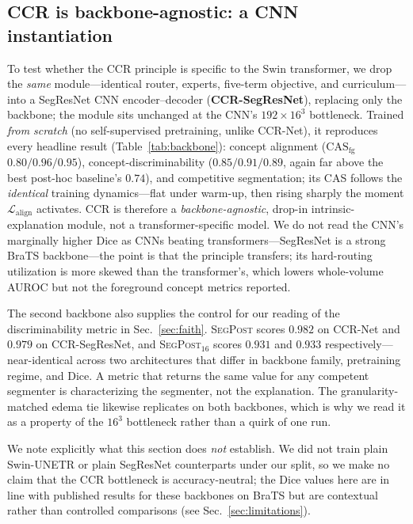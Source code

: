 \documentclass[runningheads]{llncs}
\newcommand{\casfg}{\mathrm{CAS}_{\mathrm{fg}}}
\begin{document}
\subsection{CCR is backbone-agnostic: a CNN instantiation}\label{sec:backbone}
To test whether the CCR principle is specific to the Swin transformer, we drop the \emph{same}
module---identical router, experts, five-term objective, and curriculum---into a SegResNet CNN
encoder--decoder (\textbf{CCR-SegResNet}), replacing only the backbone; the module sits unchanged
at the CNN's $192\times16^3$ bottleneck. Trained \emph{from scratch} (no self-supervised
pretraining, unlike CCR-Net), it reproduces every headline result (Table~\ref{tab:backbone}):
concept alignment ($\casfg$ $0.80/0.96/0.95$), concept-discriminability ($0.85/0.91/0.89$, again
far above the best post-hoc baseline's $0.74$), and competitive segmentation; its CAS follows the
\emph{identical} training dynamics---flat under warm-up, then rising sharply the moment
$\mathcal{L}_{\text{align}}$ activates. CCR is therefore a \emph{backbone-agnostic}, drop-in
intrinsic-explanation module, not a transformer-specific model. We do not read the CNN's
marginally higher Dice as CNNs beating transformers---SegResNet is a strong BraTS backbone---the
point is that the principle transfers; its hard-routing utilization is more skewed than the
transformer's, which lowers whole-volume AUROC but not the foreground concept metrics reported.

The second backbone also supplies the control for our reading of the discriminability metric in
Sec.~\ref{sec:faith}. \textsc{SegPost} scores $0.982$ on CCR-Net and $0.979$ on CCR-SegResNet, and
\textsc{SegPost}$_{16}$ scores $0.931$ and $0.933$ respectively---near-identical across two
architectures that differ in backbone family, pretraining regime, and Dice. A metric that returns
the same value for any competent segmenter is characterizing the segmenter, not the explanation.
The granularity-matched edema tie likewise replicates on both backbones, which is why we read it
as a property of the $16^3$ bottleneck rather than a quirk of one run.

We note explicitly what this section does \emph{not} establish. We did not train plain
Swin-UNETR or plain SegResNet counterparts under our split, so we make no claim that the CCR
bottleneck is accuracy-neutral; the Dice values here are in line with published results for these
backbones on BraTS but are contextual rather than controlled comparisons
(see Sec.~\ref{sec:limitations}).
\end{document}
